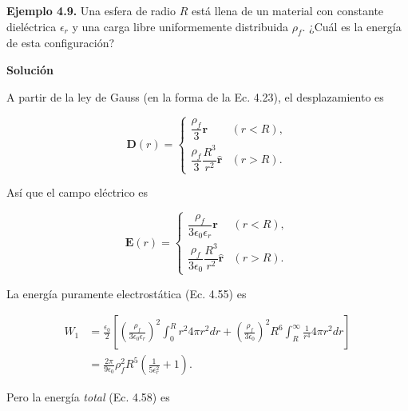 \documentclass[12pt,a4paper]{report}
\newcommand{\esp}{\vspace{0.5cm}}
\begin{document}
	\esp
	
	\noindent \textbf{Ejemplo 4.9.} Una esfera de radio $R$ está llena de un material con constante dieléctrica $\epsilon_r$ y una carga libre uniformemente distribuida $\rho_f$. ¿Cuál es la energía de esta configuración?
	
	\esp
	
	\noindent \textbf{Solución}
	
	\esp
	
	\noindent A partir de la ley de Gauss (en la forma de la Ec. 4.23), el desplazamiento es
	
	\esp
	
	\begin{equation}
		\mathbf{D}(r) = \begin{cases} \dfrac{\rho_f}{3} \mathbf{r} & (r < R), \\ \dfrac{\rho_f}{3} \dfrac{R^3}{r^2} \hat{\mathbf{r}} & (r > R). \end{cases}
	\end{equation}
	
	\esp
	
	\noindent Así que el campo eléctrico es
	
	\esp
	
	\begin{equation}
		\mathbf{E}(r) = \begin{cases} \dfrac{\rho_f}{3\epsilon_0\epsilon_r} \mathbf{r} & (r < R), \\ \dfrac{\rho_f}{3\epsilon_0} \dfrac{R^3}{r^2} \hat{\mathbf{r}} & (r > R). \end{cases}
	\end{equation}
	
	\esp
	
	\noindent La energía puramente electrostática (Ec. 4.55) es
	
	\esp
	
	\begin{equation}
		\begin{aligned}
			W_1 &= \frac{\epsilon_0}{2} \left[ \left( \frac{\rho_f}{3\epsilon_0\epsilon_r} \right)^2 \int_0^R r^2 4\pi r^2 dr + \left( \frac{\rho_f}{3\epsilon_0} \right)^2 R^6 \int_R^\infty \frac{1}{r^4} 4\pi r^2 dr \right] \\
			&= \frac{2\pi}{9\epsilon_0} \rho_f^2 R^5 \left( \frac{1}{5\epsilon_r^2} + 1 \right).
		\end{aligned}
	\end{equation}
	
	\esp
	
	Pero la energía \textit{total} (Ec. 4.58) es
	
\end{document}
